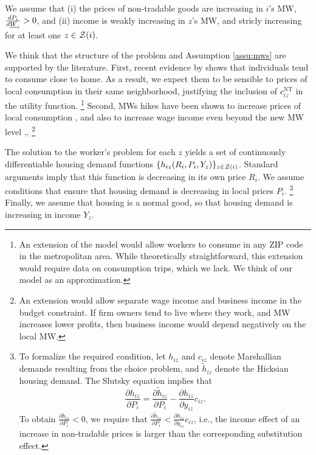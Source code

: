 \begin{assu}\label{assu:mws}
    We assume that
    (i) the prices of non-tradable goods are increasing in $i$'s MW, 
    $\frac{d P_i}{d \underline{W}_i} > 0$, and
    (ii) income is weakly increasing in $z$'s MW, and stricly increasing for at 
    least one $z\in\mathcal{Z}(i)$.
\end{assu}

We think that the structure of the problem and
Assumption \ref{assu:mws} are supported by the literature.
First, recent evidence by \textcite{MiyauchiEtAl2021} shows that individuals tend 
to consume close to home.
As a result, we expect them to be sensible to prices of local consumption in their 
same neighborhood, justifying the inclusion of $c^{\text{NT}}_{iz}$ in the utility
function.%
\footnote{An extension of the model would allow workers to consume in any ZIP code
in the metropolitan area.
While theoretically straightforward, this extension would require data on consumption
trips, which we lack.
We think of our model as an approximation.}
Second, MWs hikes have been shown to increase prices of local consumption 
\parencite[e.g.,][]{AllegrettoReich2018, Leung2021},
and also to increase wage income even beyond the new MW 
level \parencite[e.g.,][]{CegnizEtAl2019},.%
\footnote{An extension would allow separate wage income and business income in 
the budget constraint.
If firm owners tend to live where they work, and MW increases lower profits,
then business income would depend negatively on the local MW.}

The solution to the worker's problem for each $z$ yields a set of continuously 
differentiable housing demand functions $\{h_{iz} (R_i, P_i, Y_z)\}_{z\in\mathcal{Z}(i)}$.
Standard arguments imply that this function is decreasing in its own price $R_i$.
We assume conditions that ensure that housing demand is decreasing in local 
prices $P_i$.%
\footnote{To formalize the required condition, let $h_{iz}$ and $c_{iz}$ denote 
Marshallian demands resulting from the choice problem, and $\tilde h_{iz}$ 
denote the Hicksian housing demand.
The Slutsky equation implies that
$$\frac{\partial h_{iz}}{\partial P_i} 
   = \frac{\partial \tilde h_{iz}}{\partial P_i} 
   - \frac{\partial h_{iz}}{\partial y_{iz}} c_{iz}.$$
To obtain $\frac{\partial h_{iz}}{\partial P_i} < 0$, we require that 
$\frac{\partial \tilde h_{iz}}{\partial P_i} 
< \frac{\partial h_{iz}}{\partial y_{iz}} c_{iz}$, i.e., the income effect of an 
increase in non-tradable prices is larger than the corresponding substitution 
effect.}
Finally, we assume that housing is a normal good, so that housing demand is 
increasing in income $Y_z$.

